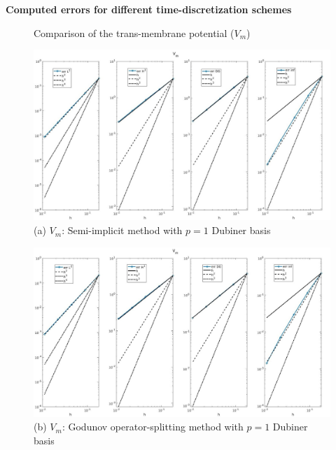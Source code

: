 \documentclass[a4paper,11pt]{article}
\begin{document}
\begin{center}
\textbf{Computed errors for different time-discretization schemes}
\end{center}
\begin{figure}[h]
\caption{Comparison of the trans-membrane potential ($V_m$)}
\label{Vm-time}
\begin{center}
\includegraphics[width = \textwidth]{./errors/D1_Vm_1.jpg}
\caption*{(a) $V_m$: Semi-implicit method with $p=1$ Dubiner basis}
\end{center}
\end{figure}
\begin{figure}[H]
\begin{center}
\includegraphics[width =\textwidth]{./errors/D1_Vm_1_GO.jpg}
\caption*{(b) $V_m$: Godunov operator-splitting method with $p=1$ Dubiner basis}
\end{center}
\end{figure}
\newpage
\end{document}
